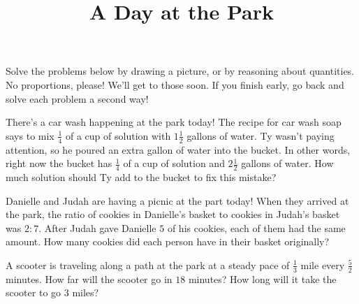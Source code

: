 \documentclass{ximera}
\title{A Day at the Park}
\begin{document}
\begin{abstract}
\end{abstract}
\maketitle

Solve the problems below by drawing a picture, or by reasoning about quantities. No proportions, please! We'll get to those soon.  If you finish early, go back and solve each problem a second way!


\begin{problem}
There's a car wash happening at the park today!  The recipe for car wash soap says to mix $\frac{1}{4}$ of a cup of solution with $1 \frac{1}{2}$ gallons of water.  Ty wasn't paying attention, so he poured an extra gallon of water into the bucket.  In other words, right now the bucket has $\frac{1}{4}$ of a cup of solution and $2 \frac{1}{2}$ gallons of water.  How much solution should Ty add to the bucket to fix this mistake?

\end{problem}


\begin{problem}
Danielle and Judah are having a picnic at the part today!  When they arrived at the park, the ratio of cookies in Danielle's basket to cookies in Judah's basket was $2:7$.  After Judah gave Danielle $5$ of his cookies, each of them had the same amount.  How many cookies did each person have in their basket originally?
\end{problem}

\begin{problem}
A scooter is traveling along a path at the park at a steady pace of $\frac{1}{3}$ mile every $\frac{5}{2}$ minutes.  How far will the scooter go in $18$ minutes?  How long will it take the scooter to go $3$ miles?
\end{problem}
\end{document}
